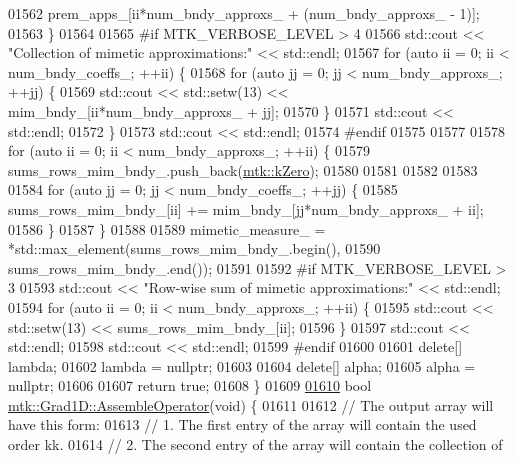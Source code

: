 \begin{DoxyCode}
{{01562       prem\_apps\_[ii*num\_bndy\_approxs\_ + (num\_bndy\_approxs\_ - 1)];
01563   \}
01564 
01565 \textcolor{preprocessor}{  #if MTK\_VERBOSE\_LEVEL > 4}
01566   std::cout << \textcolor{stringliteral}{"Collection of mimetic approximations:"} << std::endl;
01567   \textcolor{keywordflow}{for} (\textcolor{keyword}{auto} ii = 0; ii < num\_bndy\_coeffs\_; ++ii) \{
01568     \textcolor{keywordflow}{for} (\textcolor{keyword}{auto} jj = 0; jj < num\_bndy\_approxs\_; ++jj) \{
01569       std::cout << std::setw(13) << mim\_bndy\_[ii*num\_bndy\_approxs\_ + jj];
01570     \}
01571     std::cout << std::endl;
01572   \}
01573   std::cout << std::endl;
01574 \textcolor{preprocessor}{  #endif}
01575 
01577 
01578   \textcolor{keywordflow}{for} (\textcolor{keyword}{auto} ii = 0; ii < num\_bndy\_approxs\_; ++ii) \{
01579     sums\_rows\_mim\_bndy\_.push\_back(\hyperlink{group__c01-roots_ga59a451a5fae30d59649bcda274fea271}{mtk::kZero});
01580 
01581 
01582 
01583 
01584     \textcolor{keywordflow}{for} (\textcolor{keyword}{auto} jj = 0; jj < num\_bndy\_coeffs\_; ++jj) \{
01585       sums\_rows\_mim\_bndy\_[ii] += mim\_bndy\_[jj*num\_bndy\_approxs\_ + ii];
01586     \}
01587   \}
01588 
01589     mimetic\_measure\_ = *std::max\_element(sums\_rows\_mim\_bndy\_.begin(),
01590                                       sums\_rows\_mim\_bndy\_.end());
01591 
01592 \textcolor{preprocessor}{  #if MTK\_VERBOSE\_LEVEL > 3}
01593   std::cout << \textcolor{stringliteral}{"Row-wise sum of mimetic approximations:"} << std::endl;
01594   \textcolor{keywordflow}{for} (\textcolor{keyword}{auto} ii = 0; ii < num\_bndy\_approxs\_; ++ii) \{
01595     std::cout << std::setw(13) << sums\_rows\_mim\_bndy\_[ii];
01596   \}
01597   std::cout << std::endl;
01598   std::cout << std::endl;
01599 \textcolor{preprocessor}{  #endif}
01600 
01601   \textcolor{keyword}{delete}[] lambda;
01602   lambda = \textcolor{keyword}{nullptr};
01603 
01604   \textcolor{keyword}{delete}[] alpha;
01605   alpha = \textcolor{keyword}{nullptr};
01606 
01607   \textcolor{keywordflow}{return} \textcolor{keyword}{true};
01608 \}
01609 
\hypertarget{mtk__grad__1d_8cc_source_l01610}{}\hyperlink{classmtk_1_1Grad1D_a4eb4d363506b8c64b2bb18a318bbd259}{01610} \textcolor{keywordtype}{bool} \hyperlink{classmtk_1_1Grad1D_a4eb4d363506b8c64b2bb18a318bbd259}{mtk::Grad1D::AssembleOperator}(\textcolor{keywordtype}{void}) \{
01611 
01612   \textcolor{comment}{// The output array will have this form:}
01613   \textcolor{comment}{// 1. The first entry of the array will contain the used order kk.}
01614   \textcolor{comment}{// 2. The second entry of the array will contain the collection of}
}}
\end{DoxyCode}
